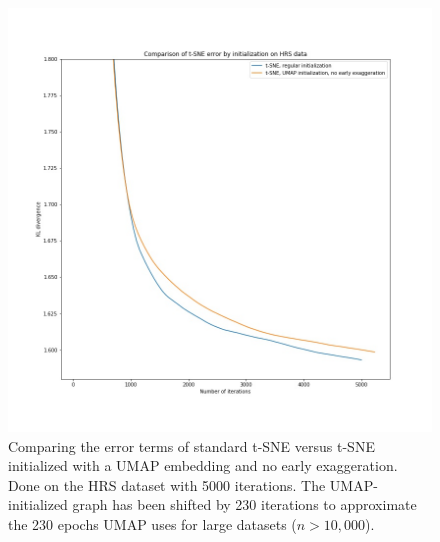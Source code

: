 \documentclass[12pt]{pnas-new}
\begin{document}
\begin{figure}[!htb]
    \centering
    \includegraphics[width=0.95\columnwidth]{images/tsne_umap_graph_hrs.jpeg}
    \caption{Comparing the error terms of standard t-SNE versus t-SNE initialized with a UMAP embedding and no early exaggeration. Done on the HRS dataset with 5000 iterations. The UMAP-initialized graph has been shifted by 230 iterations to approximate the 230 epochs UMAP uses for large datasets ($n>10,000$).}
    \label{fig:supp_tsne_umap_compare_hrs_graph}
\end{figure}
\end{document}
